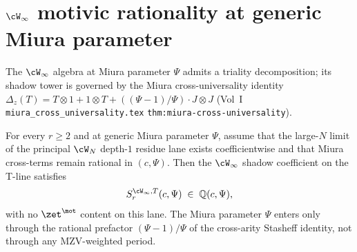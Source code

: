 \section{$\cW_{\infty}$ motivic rationality at generic Miura parameter}
\label{sec:w-infty-motivic-rationality}

The $\cW_{\infty}$ algebra at Miura parameter $\Psi$ admits a
triality decomposition; its shadow tower is governed by the Miura
cross-universality identity
$\Delta_z(T) = T \otimes 1 + 1 \otimes T + ((\Psi - 1)/\Psi) \cdot J
\otimes J$ (Vol~I \texttt{miura\_cross\_universality.tex}
\texttt{thm:miura-cross-universality}).

\begin{theorem}
\ClaimStatusConditional
For every $r \geq 2$ and at generic Miura parameter $\Psi$, assume
that the large-$N$ limit of the principal $\cW_N$ depth-$1$ residue
lane exists coefficientwise and that Miura cross-terms remain rational
in $(c,\Psi)$. Then the
$\cW_{\infty}$ shadow coefficient on the T-line satisfies
\[
 S_r^{\cW_{\infty}, T}(c, \Psi) \;\in\; \mathbb{Q}(c, \Psi),
\]
with no $\zet^{\mot}$ content on this lane. The Miura parameter
$\Psi$ enters only through
the rational prefactor $(\Psi - 1)/\Psi$ of the cross-arity
Stasheff identity, not through any MZV-weighted period.
\end{theorem}

